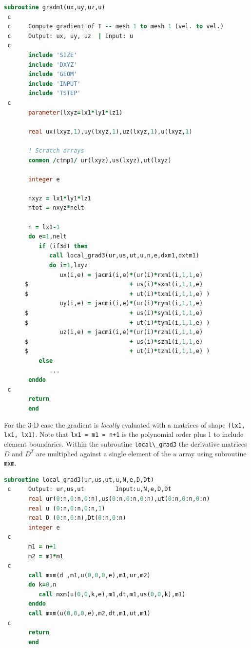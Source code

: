 \documentclass[
  a4paper,
  10pt]{article}
\newcommand{\passthrough}[1]{#1}
\begin{document}
\begin{lstlisting}[language=Fortran]
       subroutine gradm1(ux,uy,uz,u)
 c
 c     Compute gradient of T -- mesh 1 to mesh 1 (vel. to vel.)
 c     Output: ux, uy, uz  | Input: u
 c
       include 'SIZE'
       include 'DXYZ'
       include 'GEOM'
       include 'INPUT'
       include 'TSTEP'
 c
       parameter(lxyz=lx1*ly1*lz1)
 
       real ux(lxyz,1),uy(lxyz,1),uz(lxyz,1),u(lxyz,1)
 
       ! Scratch arrays
       common /ctmp1/ ur(lxyz),us(lxyz),ut(lxyz)
 
       integer e
 
       nxyz = lx1*ly1*lz1
       ntot = nxyz*nelt
 
       n = lx1-1
       do e=1,nelt
          if (if3d) then
             call local_grad3(ur,us,ut,u,n,e,dxm1,dxtm1)
             do i=1,lxyz
                ux(i,e) = jacmi(i,e)*(ur(i)*rxm1(i,1,1,e)
      $                             + us(i)*sxm1(i,1,1,e)
      $                             + ut(i)*txm1(i,1,1,e) )
                uy(i,e) = jacmi(i,e)*(ur(i)*rym1(i,1,1,e)
      $                             + us(i)*sym1(i,1,1,e)
      $                             + ut(i)*tym1(i,1,1,e) )
                uz(i,e) = jacmi(i,e)*(ur(i)*rzm1(i,1,1,e)
      $                             + us(i)*szm1(i,1,1,e)
      $                             + ut(i)*tzm1(i,1,1,e) )
          else
             ...
       enddo
 c
       return
       end
\end{lstlisting}

For the 3-D case the gradient is \emph{locally} evaluated with a
matrices of shape \passthrough{\lstinline!(lx1, lx1, lx1)!}. Note that
\passthrough{\lstinline!lx1 = m1 = n+1!} is the polynomial order plus 1
to include element boundaries. Within the subroutine
\passthrough{\lstinline!local\_grad3!} the derivative matrices \(D\) and
\(D^T\) are multiplied against a single element of the \(u\) array using
subroutine \passthrough{\lstinline!mxm!}.

\begin{lstlisting}[language=Fortran]
       subroutine local_grad3(ur,us,ut,u,N,e,D,Dt)
 c     Output: ur,us,ut         Input:u,N,e,D,Dt
       real ur(0:n,0:n,0:n),us(0:n,0:n,0:n),ut(0:n,0:n,0:n)
       real u (0:n,0:n,0:n,1)
       real D (0:n,0:n),Dt(0:n,0:n)
       integer e
 c
       m1 = n+1
       m2 = m1*m1
 c
       call mxm(d ,m1,u(0,0,0,e),m1,ur,m2)
       do k=0,n
          call mxm(u(0,0,k,e),m1,dt,m1,us(0,0,k),m1)
       enddo
       call mxm(u(0,0,0,e),m2,dt,m1,ut,m1)
 c
       return
       end
\end{lstlisting}
\end{document}
